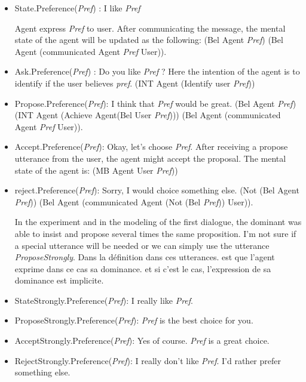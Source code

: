 \documentclass{llncs}
\begin{document}
 \begin{itemize}
 \item State.Preference(\textit{Pref}) : I like \textit{Pref} 
 \par Agent express \textit{Pref} to user. After communicating the message, the mental state of the agent will be updated as the following: 
  \newline (Bel Agent \textit{Pref})
  \newline (Bel Agent (communicated Agent \textit{Pref} User)).
  
 \item Ask.Preference(\textit{Pref}) : Do you like \textit{Pref} ?
 \newline  Here the intention of the agent is to identify if the user believes \textit{pref}. 
 \newline (INT Agent (Identify user \textit{Pref}))
 \item Propose.Preference(\textit{Pref}): I think that \textit{Pref} would be great.
  \newline (Bel Agent \textit{Pref})
  \newline(INT Agent (Achieve Agent(Bel User \textit{Pref})))
  \newline (Bel Agent (communicated Agent \textit{Pref} User)).
 \item Accept.Preference(\textit{Pref}): Okay, let's choose \textit{Pref}. After receiving a propose utterance from the user, the agent might accept the proposal. The mental state of the agent is: 
 \newline (MB Agent User \textit{Pref})) 

 \item reject.Preference(\textit{Pref}): Sorry, I would choice something else.
  \newline (Not (Bel Agent \textit{Pref}))
  \newline (Bel Agent (communicated Agent (Not (Bel \textit{Pref})) User)).
  
\par In the experiment and in the modeling of the first dialogue, the dominant was able to insist and propose several times the same proposition. I'm not sure if a special utterance will be needed or we can simply use the utterance \textit{ProposeStrongly}. 
Dans la définition dans ces utterances. est que l'agent exprime dans ce cas sa dominance. et si c'est le cas, l'expression de sa dominance est implicite. 
 \item StateStrongly.Preference(\textit{Pref}): I really like \textit{Pref}.
 \item ProposeStrongly.Preference(\textit{Pref}): \textit{Pref} is the best choice for you.
 \item AcceptStrongly.Preference(\textit{Pref}): Yes of course. \textit{Pref} is a great choice.
  \item RejectStrongly.Preference(\textit{Pref}): I really don't like \textit{Pref}. I'd rather prefer something else.
 \end{itemize} 
\end{document}

